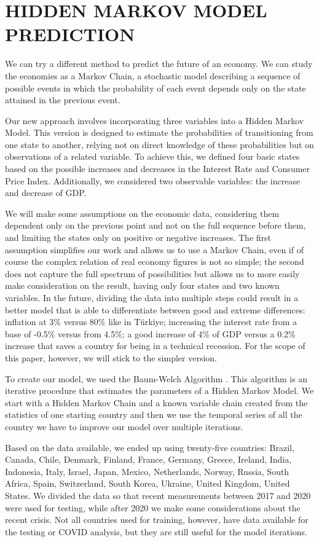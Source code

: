 \section{HIDDEN MARKOV MODEL PREDICTION}
\label{sec:hmm}
We can try a different method to predict the future of an economy. We can study the economies as a Markov Chain, a stochastic model describing a sequence of possible events in which the probability of each event depends only on the state attained in the previous event.

Our new approach involves incorporating three variables into a Hidden Markov Model. This version is designed to estimate the probabilities of transitioning from one state to another, relying not on direct knowledge of these probabilities but on observations of a related variable. To achieve this, we defined four basic states based on the possible increases and decreases in the Interest Rate and Consumer Price Index. Additionally, we considered two observable variables: the increase and decrease of GDP.

We will make some assumptions on the economic data, considering them dependent only on the previous point and not on the full sequence before them, and limiting the states only on positive or negative increases. The first assumption simplifies our work and allows us to use a Markov Chain, even if of course the complex relation of real economy figures is not so simple; the second does not capture the full spectrum of possibilities but allows us to more easily make consideration on the result, having only four states and two known variables. In the future, dividing the data into multiple steps could result in a better model that is able to differentiate between good and extreme differences: inflation at 3\% versus 80\% like in Türkiye; increasing the interest rate from a base of -0.5\% versus from 4.5\%; a good increase of 4\% of GDP versus a 0.2\% increase that saves a country for being in a technical recession. For the scope of this paper, however, we will stick to the simpler version.

To create our model, we used the Baum-Welch Algorithm \cite{baum}. This algorithm is an iterative procedure that estimates the parameters of a Hidden Markov Model. We start with a Hidden Markov Chain and a known variable chain created from the statistics of one starting country and then we use the temporal series of all the country we have to improve our model over multiple iterations.

Based on the data available, we ended up using twenty-five countries: Brazil, Canada, Chile, Denmark, Finland, France, Germany, Greece, Ireland, India, Indonesia, Italy, Israel, Japan, Mexico, Netherlands, Norway, Russia, South Africa, Spain, Switzerland, South Korea, Ukraine, United Kingdom, United States. We divided the data so that recent measurements between 2017 and 2020 were used for testing, while after 2020 we make some considerations about the recent crisis. Not all countries used for training, however, have data available for the testing or COVID analysis, but they are still useful for the model iterations.

